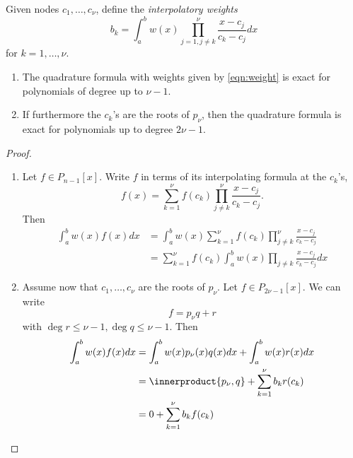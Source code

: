 \documentclass[a4paper]{article}
\newcommand*{\inner}{\innerproduct}
\begin{document}
Given nodes \(c_1, \dots, c_\nu\), define the \emph{interpolatory weights}
\begin{equation}
  \label{eqn:weight}
  b_k = \int_a^b w(x) \prod_{j = 1, j \neq k}^\nu \frac{x - c_j}{c_k - c_j} dx
  \tag{\(\ast\ast\)}
\end{equation}
for \(k = 1, \dots, \nu\).

\begin{theorem}\leavevmode
  \begin{enumerate}
  \item The quadrature formula with weights given by \eqref{eqn:weight} is exact for polynomials of degree up to \(\nu - 1\).
  \item If furthermore the \(c_k\)'s are the roots of \(p_\nu\), then the quadrature formula is exact for polynomials up to degree \(2\nu - 1\).
  \end{enumerate}
\end{theorem}

\begin{proof}\leavevmode
  \begin{enumerate}
  \item Let \(f \in P_{n - 1}[x]\). Write \(f\) in terms of its interpolating formula at the \(c_k\)'s,
    \[
      f(x) = \sum_{k = 1}^\nu f(c_k) \prod_{j \neq k}^\nu \frac{x - c_j}{c_k - c_j}.
    \]
    Then
    \begin{align*}
      \int_a^b w(x)f(x) dx &= \int_a^b w(x) \sum_{k = 1}^\nu f(c_k) \prod_{j \neq k}^\nu \frac{x - c_j}{c_k - c_j} \\
      &= \sum_{k = 1}^\nu f(c_k) \int_a^b w(x) \prod_{j \neq k} \frac{x - c_j}{c_k - c_j} dx
    \end{align*}
  \item Assume now that \(c_1, \dots, c_\nu\) are the roots of \(p_\nu\). Let \(f \in P_{2\nu - 1}[x]\). We can write
    \[
      f = p_\nu q + r
    \]
    with \(\deg r \leq \nu - 1, \deg q \leq \nu - 1\). Then
    \begin{align*}
      \int_a^b w(x)f(x) dx &= \int_a^b w(x)p_\nu(x) q(x) dx + \int_a^b w(x)r(x) dx \\
                           &= \inner{p_\nu, q} + \sum_{k = 1}^\nu b_k r(c_k) \\
                           &= 0 + \sum_{k = 1}^\nu b_kf(c_k)
    \end{align*}
  \end{enumerate}
\end{proof}
\end{document}
